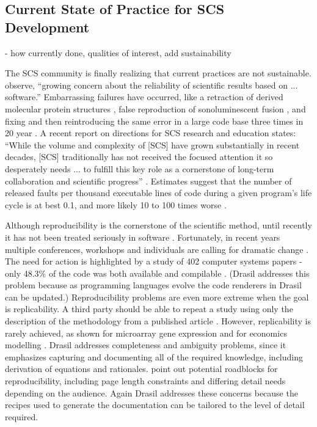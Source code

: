 \documentclass[12pt]{article}
\begin{document}
\subsection{Current State of Practice for SCS Development}

- how currently done, qualities of interest, add sustainability

The SCS community is finally realizing that current practices are not
sustainable.  \citet{FaulkEtAl2009} observe, ``growing concern about the
reliability of scientific results based on ... software.''  Embarrassing
failures have occurred, like a retraction of derived molecular protein
structures \citep{Miller2006}, false reproduction of sonoluminescent fusion
\citep{PostAndVotta2005}, and fixing and then reintroducing the same error in a
large code base three times in 20 year \citep{MilewiczAndRaybourn2018}.  A
recent report on directions for SCS research and education states: ``While the
volume and complexity of [SCS] have grown substantially in recent decades, [SCS]
traditionally has not received the focused attention it so desperately needs
... to fulfill this key role as a cornerstone of long-term collaboration and
scientific progress'' \citep{RudeEtAl2018}.  Estimates suggest that the number
of released faults per thousand executable lines of code during a given
program’s life cycle is at best 0.1, and more likely 10 to 100 times worse
\citep{Hatton2007}.

Although reproducibility is the cornerstone of the scientific method, until
recently it has not been treated seriously in software
\citep{BenureauAndRougier2017}.  Fortunately, in recent years multiple
conferences, workshops and individuals are calling for dramatic change
\citep{BaileyEtAl2016}.  The need for action is highlighted by a study of 402
computer systems papers - only 48.3\% of the code was both available and
compilable \citep{CollbergEtAl2015}.  (Drasil addresses this problem because as
programming languages evolve the code renderers in Drasil can be updated.)
Reproducibility problems are even more extreme when the goal is replicability.
A third party should be able to repeat a study using only the description of the
methodology from a published article %
\citep{BenureauAndRougier2017}.  However, replicability is rarely achieved, as
shown for microarray gene expression \citep{IoannidisEtAl2009} and for economics
modelling \citep{IonescuAndJansson2013}.  Drasil addresses completeness and
ambiguity problems, since it emphasizes capturing and documenting all of the
required knowledge, including derivation of equations and
rationales. \citet{CrickAndHall2014} point out potential roadblocks for
reproducibility, including page length constraints and differing detail needs
depending on the audience.  Again Drasil addresses these concerns because the
recipes used to generate the documentation can be tailored to the level of
detail required.
\end{document}
